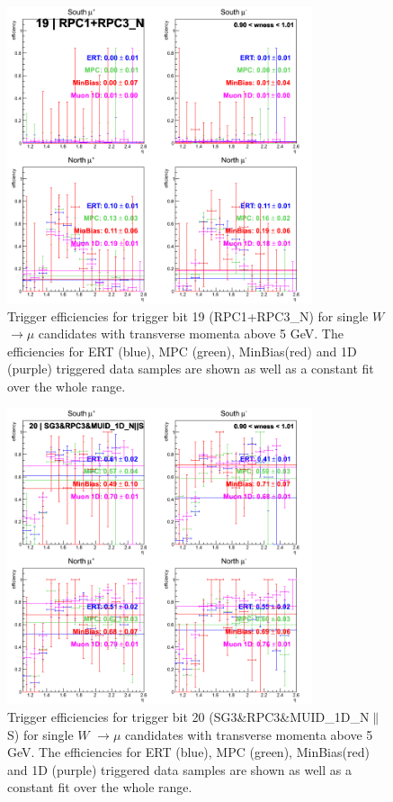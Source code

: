 \clearpage
\begin{figure}[h!]

  \centering

  \includegraphics[width=0.8\textwidth]{./figures/run13_trigeffieta_w1_trig19_lin.png}
  \caption{\label{fig:run13_trigeffieta_w0_nper0_trig19_lin} Trigger efficiencies for trigger bit 19 (RPC1+RPC3\_N) for single $W$ $\rightarrow \mu$ candidates with transverse momenta above 5 GeV. The efficiencies for ERT (blue), MPC (green), MinBias(red) and 1D (purple) triggered data samples are shown as well as a constant fit over the whole range.}

\end{figure}
\clearpage
\begin{figure}[h!]

  \centering

  \includegraphics[width=0.8\textwidth]{./figures/run13_trigeffieta_w1_trig20_lin.png}
  \caption{\label{fig:run13_trigeffieta_w0_nper0_trig20_lin} Trigger efficiencies for trigger bit 20 (SG3\&RPC3\&MUID\_1D\_N$\|$S) for single $W$ $\rightarrow \mu$ candidates with transverse momenta above 5 GeV. The efficiencies for ERT (blue), MPC (green), MinBias(red) and 1D (purple) triggered data samples are shown as well as a constant fit over the whole range.}

\end{figure}
